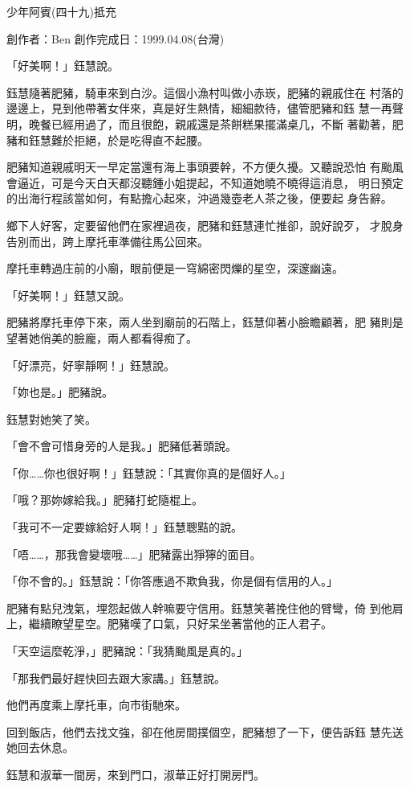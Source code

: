 



少年阿賓(四十九)抵充

創作者：Ben
創作完成日：1999.04.08(台灣)


「好美啊！」鈺慧說。

鈺慧隨著肥豬，騎車來到白沙。這個小漁村叫做小赤崁，肥豬的親戚住在
村落的邊邊上，見到他帶著女伴來，真是好生熱情，細細款待，儘管肥豬和鈺
慧一再聲明，晚餐已經用過了，而且很飽，親戚還是茶餅糕果擺滿桌几，不斷
著勸著，肥豬和鈺慧難於拒絕，於是吃得直不起腰。

肥豬知道親戚明天一早定當還有海上事頭要幹，不方便久擾。又聽說恐怕
有颱風會逼近，可是今天白天都沒聽鍾小姐提起，不知道她曉不曉得這消息，
明日預定的出海行程該當如何，有點擔心起來，沖過幾壺老人茶之後，便要起
身告辭。

鄉下人好客，定要留他們在家裡過夜，肥豬和鈺慧連忙推卻，說好說歹，
才脫身告別而出，跨上摩托車準備往馬公回來。

摩托車轉過庄前的小廟，眼前便是一穹綿密閃爍的星空，深邃幽遠。

「好美啊！」鈺慧又說。

肥豬將摩托車停下來，兩人坐到廟前的石階上，鈺慧仰著小臉瞻顧著，肥
豬則是望著她俏美的臉龐，兩人都看得痴了。

「好漂亮，好寧靜啊！」鈺慧說。

「妳也是。」肥豬說。

鈺慧對她笑了笑。

「會不會可惜身旁的人是我。」肥豬低著頭說。

「你……你也很好啊！」鈺慧說：「其實你真的是個好人。」

「哦？那妳嫁給我。」肥豬打蛇隨棍上。

「我可不一定要嫁給好人啊！」鈺慧聰黠的說。

「唔……，那我會變壞哦……」肥豬露出猙獰的面目。

「你不會的。」鈺慧說：「你答應過不欺負我，你是個有信用的人。」

肥豬有點兒洩氣，埋怨起做人幹嘛要守信用。鈺慧笑著挽住他的臂彎，倚
到他肩上，繼續瞭望星空。肥豬嘆了口氣，只好呆坐著當他的正人君子。

「天空這麼乾淨，」肥豬說：「我猜颱風是真的。」

「那我們最好趕快回去跟大家講。」鈺慧說。

他們再度乘上摩托車，向市街馳來。

回到飯店，他們去找文強，卻在他房間撲個空，肥豬想了一下，便告訴鈺
慧先送她回去休息。

鈺慧和淑華一間房，來到門口，淑華正好打開房門。

